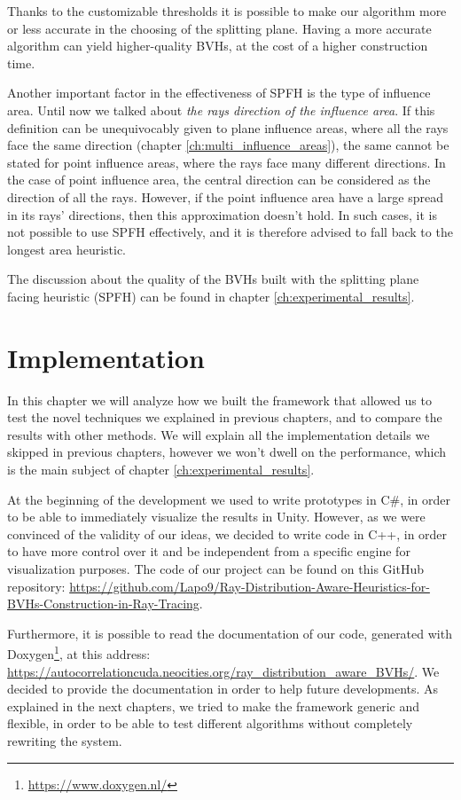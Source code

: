 \documentclass{PoliMi_MasterThesis}
\begin{document}
Thanks to the customizable thresholds it is possible to make our algorithm more or less accurate in the choosing of the splitting plane. Having a more accurate algorithm can yield higher-quality BVHs, at the cost of a higher construction time.

Another important factor in the effectiveness of SPFH is the type of influence area. Until now we talked about \textit{the rays direction of the influence area}. If this definition can be unequivocably given to plane influence areas, where all the rays face the same direction (chapter \ref{ch:multi_influence_areas}), the same cannot be stated for point influence areas, where the rays face many different directions. In the case of point influence area, the central direction can be considered as the direction of all the rays. However, if the point influence area have a large spread in its rays' directions, then this approximation doesn't hold. In such cases, it is not possible to use SPFH effectively, and it is therefore advised to fall back to the longest area heuristic.
	
The discussion about the quality of the BVHs built with the splitting plane facing heuristic (SPFH) can be found in chapter \ref{ch:experimental_results}.

\chapter{Implementation} \label{ch:implementation}
In this chapter we will analyze how we built the framework that allowed us to test the novel techniques we explained in previous chapters, and to compare the results with other methods.
We will explain all the implementation details we skipped in previous chapters, however we won't dwell on the performance, which is the main subject of chapter \ref{ch:experimental_results}.

At the beginning of the development we used to write prototypes in C\#, in order to be able to immediately visualize the results in Unity. However, as we were convinced of the validity of our ideas, we decided to write code in C++, in order to have more control over it and be independent from a specific engine for visualization purposes. The code of our project can be found on this GitHub repository: \url{https://github.com/Lapo9/Ray-Distribution-Aware-Heuristics-for-BVHs-Construction-in-Ray-Tracing}.

Furthermore, it is possible to read the documentation of our code, generated with Doxygen\footnote{\url{https://www.doxygen.nl/}}, at this address: \url{https://autocorrelationcuda.neocities.org/ray_distribution_aware_BVHs/}. We decided to provide the documentation in order to help future developments. As explained in the next chapters, we tried to make the framework generic and flexible, in order to be able to test different algorithms without completely rewriting the system.
\end{document}
